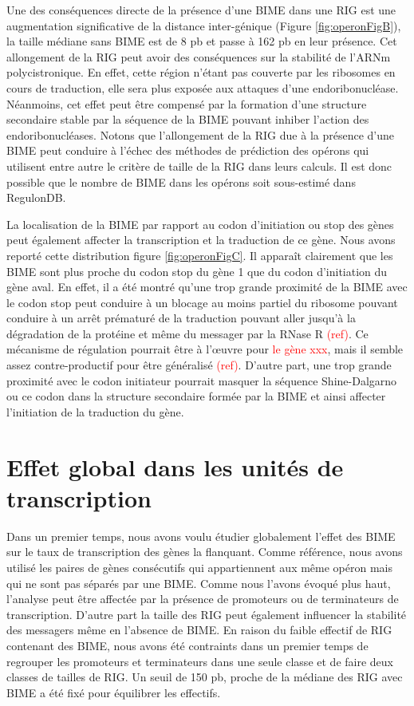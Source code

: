\documentclass[12pt,a4paper]{report}
\begin{document}
\begin{onehalfspace}
Une des conséquences directe de la présence d'une BIME dans une RIG est une augmentation significative de la distance inter-génique (Figure \autoref{fig:operonFigB}), la taille médiane sans BIME est de 8 pb et passe à 162 pb en leur présence. Cet allongement de la RIG peut avoir des conséquences sur la stabilité de l'ARNm polycistronique. En effet, cette région n'étant pas couverte par les ribosomes en cours de traduction, elle sera plus exposée aux attaques d'une endoribonucléase. Néanmoins, cet effet peut être compensé par la formation d'une structure secondaire stable par la séquence de la BIME pouvant inhiber l'action des endoribonucléases. Notons que l'allongement de la RIG due à la présence d'une BIME peut conduire à l'échec des méthodes de prédiction des opérons qui utilisent entre autre le critère de taille de la RIG dans leurs calculs. Il est donc possible que le nombre de BIME dans les opérons soit sous-estimé dans RegulonDB.

La localisation de la BIME par rapport au codon d’initiation ou stop des gènes peut également affecter la transcription et la traduction de ce gène.  Nous avons reporté cette distribution figure \autoref{fig:operonFigC}. Il apparaît clairement que les BIME sont plus proche du codon stop du gène 1 que du codon d’initiation du gène aval. En effet, il a été montré qu’une trop grande proximité de la BIME avec le codon stop peut conduire à un blocage au moins partiel du ribosome pouvant conduire à un arrêt prématuré de la traduction pouvant aller jusqu’à la dégradation de la protéine et même du messager par la RNase R \textcolor{red}{(ref)}. Ce mécanisme de régulation pourrait être à l’œuvre pour \textcolor{red}{le gène xxx}, mais il semble assez contre-productif pour être généralisé \textcolor{red}{(ref)}. D’autre part, une trop grande proximité avec le codon initiateur pourrait masquer la séquence Shine-Dalgarno ou ce codon dans la structure secondaire formée par la BIME et ainsi affecter l’initiation de la traduction du gène.

\section*{Effet global dans les unités de transcription}
Dans un premier temps, nous avons voulu étudier globalement l'effet des BIME sur le taux de transcription des gènes la flanquant. Comme référence, nous avons utilisé les paires de gènes consécutifs qui appartiennent aux même opéron mais qui ne sont pas séparés par une BIME. Comme nous l'avons évoqué plus haut, l'analyse peut être affectée par la présence de promoteurs ou de terminateurs de transcription. D'autre part la taille des RIG peut également influencer la stabilité des messagers même en l'absence de BIME. En raison du faible effectif de RIG contenant des BIME, nous avons été contraints dans un premier temps de regrouper les promoteurs et terminateurs dans une seule classe et de faire deux classes de tailles de RIG. Un seuil de 150 pb, proche de la médiane des RIG avec BIME a été fixé pour équilibrer les effectifs.


\end{onehalfspace}
\end{document}
